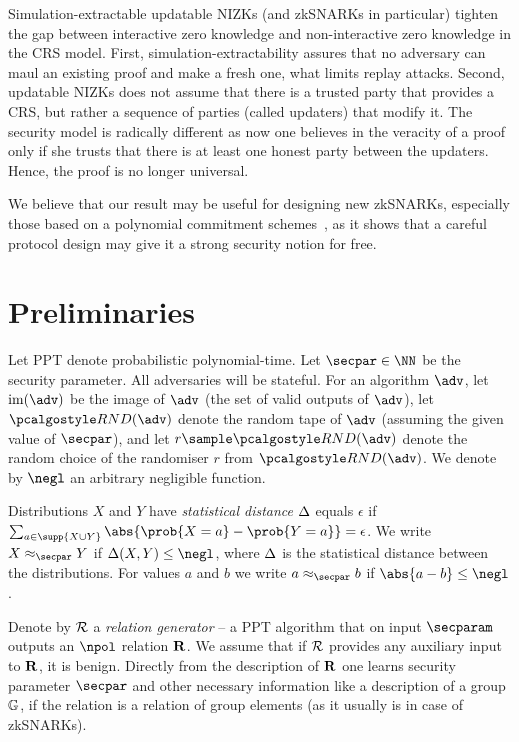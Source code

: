 \documentclass[runningheads,11pt]{llncs}
\theoremstyle{definition}
\begin{document}
Simulation-extractable updatable NIZKs (and zkSNARKs in particular) tighten the gap between interactive zero knowledge and non-interactive zero knowledge in the CRS model.
First, simulation-extractability assures that no adversary can maul an existing proof and make a fresh one, what limits replay attacks.
Second, updatable NIZKs does not assume that there is a trusted party that provides a CRS, but rather a sequence of parties (called updaters) that modify it. The security model is radically different as now one believes in the veracity of a proof only if she trusts that there is at least one honest party between the updaters. Hence, the proof is no longer universal.

We believe that our result may be useful for designing new zkSNARKs, especially those based on a polynomial commitment schemes~\cite{AC:KatZavGol10}, as it shows that a careful protocol design may give it a strong security notion for free.

\section{Preliminaries}
Let PPT denote probabilistic polynomial-time.
Let $\secpar \in \NN$ be the security parameter.
All adversaries will be stateful.
For an algorithm $\adv$, let $\image (\adv)$ be the image of $\adv$ (the set of valid outputs of $\adv$), let $\RND{\adv}$ denote the random tape of $\adv$ (assuming the given value of $\secpar$), and let $r \sample \RND{\adv}$ denote the random choice of the randomiser $r$ from $\RND{\adv}$.
We denote by $\negl$ an arbitrary negligible function.

Distributions $X$ and $Y$ have \emph{statistical distance} $\Delta$ equals $\epsilon$ if $\sum_{a \in \supp{X \cup Y}} \abs{\prob{X = a} - \prob{Y = a}} = \epsilon$.
We write $X \approx_\secpar Y$ if $\SD(X, Y) \leq \negl$, where $\Delta$ is the statistical distance between the distributions.
For values $a$ and $b$ we write $a \approx_\secpar b$ if $\abs{a - b} \leq \negl$.

Denote by $\mathcal{R}$ a \emph{relation generator} -- a PPT algorithm that on input $\secparam$ outputs an $\npol$ relation $\mathbf{R}$. We assume that if $\mathcal{R}$ provides any auxiliary input to $\mathbf{R}$, it is benign. Directly from the description of $\mathbf{R}$ one learns security parameter $\secpar$ and other necessary information like a description of a group $\mathbb{G}$, if the relation is a relation of group elements (as it usually is in case of zkSNARKs).
\end{document}
